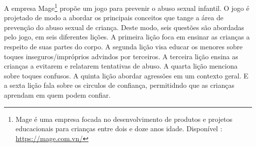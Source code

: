 




A empresa Mage\footnote{Mage é uma empresa focada no desenvolvimento de produtos e projetos educacionais para crianças entre dois e doze anos idade. Disponível : \url{https://mage.com.vn/}} propõe um jogo para prevenir o abuso sexual infantil. O jogo é projetado de modo a abordar os principais conceitos que tange a área de prevenção do abuso sexual de criança. Deste modo, seis questões são abordadas pelo jogo, 
em seis diferentes lições. A primeira lição foca em ensinar as crianças a respeito de suas partes do corpo. A segunda lição visa educar os menores sobre toques inseguros/impróprios advindos por terceiros. A terceira lição ensina as crianças a evitarem e relatarem tentativas de abuso. A quarta lição menciona sobre toques confusos. A quinta lição abordar agressões em um contexto geral. E a sexta lição fala sobre os circulos de confiança, permitidndo que as crianças aprendam em quem podem confiar.%


